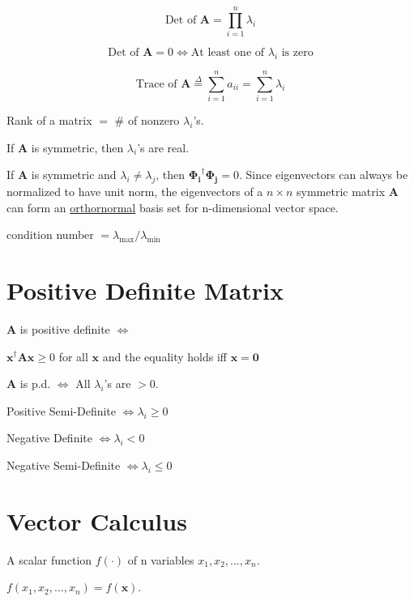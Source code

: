 \documentclass[fleqn]{article}
\begin{document}
	\begin{equation*}
		\text{Det of }\mathbf{A} = \prod_{i=1}^{n}{\lambda_i}
	\end{equation*}
	
	\begin{equation*}
		\text{Det of }\mathbf{A} = 0 \Leftrightarrow \text{At least one of }\lambda_i\text{ is zero}
	\end{equation*}
	
	\begin{equation*}
		\text{Trace of }\mathbf{A} \overset{\Delta}{=} \sum_{i=1}^{n}a_{ii} = \sum_{i=1}^{n}\lambda_i
	\end{equation*}
	
	Rank of a matrix $ = $ \# of nonzero $\lambda_i$'s.
	
	If $\mathbf{A}$ is symmetric, then $\lambda_i$'s are real.
	
	If $\mathbf{A}$ is symmetric and $\lambda_i \neq \lambda_j$, then $\mathbf{\Phi_i}^{\dag}\mathbf{\Phi_j} = 0$. Since eigenvectors can always be normalized to have unit norm, the eigenvectors of a $n \times n$ symmetric matrix $\mathbf{A}$ can form an \underline{orthornormal} basis set for n-dimensional vector space.
	
	condition number $ = \lambda_{\text{max}}/\lambda_{\text{min}}$
	
	\section{Positive Definite Matrix}
	
	$\mathbf{A}$ is positive definite $\Leftrightarrow$
	
	$\mathbf{x}^{\dag}\mathbf{A}\mathbf{x} \geq 0$ for all $\mathbf{x}$ and the equality holds iff $\mathbf{x} = \mathbf{0}$
	
	$\mathbf{A}$ is p.d. $\Leftrightarrow$ All $\lambda_i$'s are $ > 0$.
	
	Positive Semi-Definite $\Leftrightarrow \lambda_i \geq 0$
	
	Negative Definite $\Leftrightarrow \lambda_i < 0$
	
	Negative Semi-Definite $\Leftrightarrow \lambda_i \leq 0$
	\section{Vector Calculus}
	
	A scalar function $f(\cdot)$ of n variables $x_1,x_2,...,x_n$.
	
	$f(x_1,x_2,...,x_n) = f(\mathbf{x})$.
	
\end{document}
